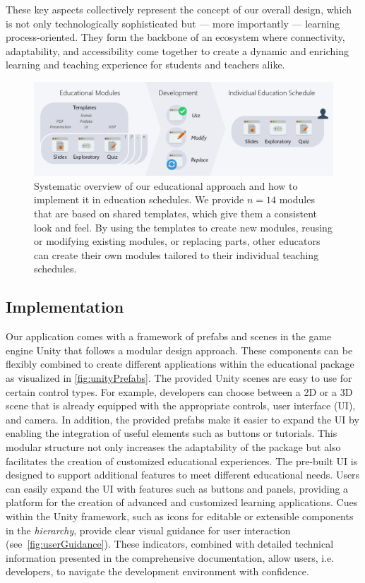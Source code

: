 These key aspects collectively represent the concept of our overall design, which is not only technologically sophisticated but --- more importantly --- learning process-oriented. They form the backbone of an ecosystem where connectivity, adaptability, and accessibility come together to create a dynamic and enriching learning and teaching experience for students and teachers alike.
\begin{figure}[t!bh]
	\centering
	\includegraphics[width=\linewidth]{pictures/modularApproach.png}
	\captionsetup{labelfont=bf,textfont=it}
	\caption{Systematic overview of our educational approach and how to implement it in education schedules. We provide $n=14$ modules that are based on shared templates, which give them a consistent look and feel. By using the templates to create new modules, reusing or modifying existing modules, or replacing parts, other educators can create their own modules tailored to their individual teaching schedules.\label{fig:modularApproach}}
\end{figure}
\subsection{Implementation}

Our application comes with a framework of prefabs and scenes in the game engine Unity that follows a modular design approach. These components can be flexibly combined to create different applications within the educational package as visualized in \autoref{fig:unityPrefabs}. The provided Unity scenes are easy to use for certain control types. For example, developers can choose between a 2D or a 3D scene that is already equipped with the appropriate controls, user interface (UI), and camera. In addition, the provided prefabs make it easier to expand the UI by enabling the integration of useful elements such as buttons or tutorials. This modular structure not only increases the adaptability of the package but also facilitates the creation of customized educational experiences.
The pre-built UI is designed to support additional features to meet different educational needs. Users can easily expand the UI with features such as buttons and panels, providing a platform for the creation of advanced and customized learning applications.
Cues within the Unity framework, such as icons for editable or extensible components in the \emph{hierarchy}, provide clear visual guidance for user interaction (see~\autoref{fig:userGuidance}). These indicators, combined with detailed technical information presented in the comprehensive documentation, allow users, i.e. developers, to navigate the development environment with confidence.

